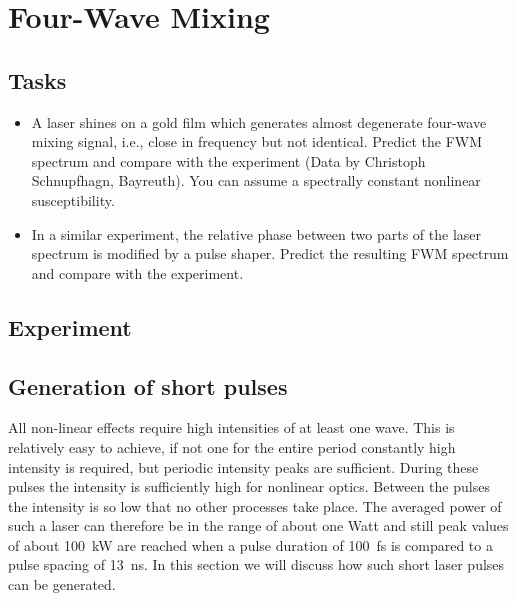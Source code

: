 \renewcommand{\lastmod}{May 22, 2020}
\chapter{Four-Wave Mixing}


\section{Tasks}

\begin{itemize}
\item A laser shines on a gold film which generates almost degenerate four-wave mixing signal, i.e., close in frequency but not identical. Predict the FWM spectrum and compare with the experiment (Data by Christoph Schnupfhagn, Bayreuth). You can assume a spectrally constant nonlinear  susceptibility.
\item In a similar experiment, the relative phase between two parts of the laser spectrum is modified by a pulse shaper. Predict the resulting FWM spectrum and compare with the experiment.
\end{itemize}

\section{Experiment}



\section{Generation of short pulses}


All non-linear effects  require high
intensities of at least one wave. This 
is relatively
easy to achieve, if not one for the entire period
constantly high intensity is required, but periodic
intensity peaks are sufficient. During these pulses the
intensity  is sufficiently high for nonlinear optics. Between the pulses 
the intensity is so low that no other processes take place. The averaged power of such a laser can therefore
be in the range of about one Watt and still 
peak values of about 100~kW are reached when a pulse duration of
100~fs is compared to a pulse spacing of 13~ns. In
this section we will discuss how such short
laser pulses can be generated.


